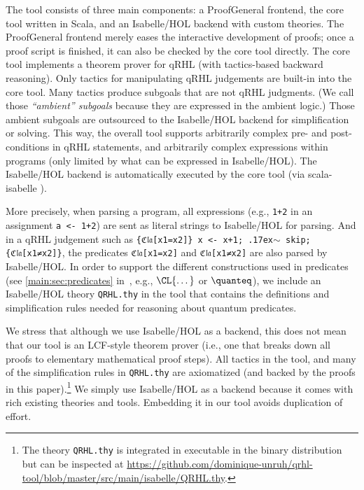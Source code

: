 \documentclass{article}
\newcommand\mytilde{\raise.17ex\hbox{$\scriptstyle\sim$}}
\newcommand\qrhlautoref[1]{\autoref*{main:#1} in~\cite{qrhl-paper-from-manual}}
\begin{document}
The tool consists of three main components: a ProofGeneral
\cite{proofgeneral} frontend, the core tool written in Scala, and an
Isabelle/HOL \cite{isabelle} backend with custom theories. The
ProofGeneral frontend merely eases the interactive development of
proofs; once a proof script is finished, it can also be checked by the
core tool directly. The core tool implements a theorem prover for qRHL
(with tactics-based backward reasoning). Only tactics for manipulating
qRHL judgements are built-in into the core tool. Many tactics produce
subgoals that are not qRHL judgments.
(We call those \emph{``ambient'' subgoals}%
 because they are expressed in the ambient logic.)
Those ambient subgoals are outsourced to
the Isabelle/HOL backend for simplification or solving. This way, the
overall tool supports arbitrarily complex pre- and post-conditions in
qRHL statements, and arbitrarily complex expressions within programs
(only limited by what can be expressed in Isabelle/HOL). The
Isabelle/HOL backend is automatically executed by the core tool (via scala-isabelle \cite{scala-isabelle}).
  

More precisely, when parsing a program, all expressions (e.g.,
\texttt{1+2} in an assignment \texttt{a <- 1+2}) are sent as literal
strings to Isabelle/HOL for parsing. And in a qRHL judgement such as
\texttt{\{ℭ𝔩𝔞[x1=x2]\} x <- x+1; \mytilde{} skip; \{ℭ𝔩𝔞[x1≠x2]\}}, the
predicates \texttt{ℭ𝔩𝔞[x1=x2]} and \texttt{ℭ𝔩𝔞[x1≠x2]} are also parsed
by Isabelle/HOL. In order to support the different constructions used
in predicates (see \qrhlautoref{sec:predicates}, e.g., $\CL{\dots}$
or $\quanteq$),
we include an Isabelle/HOL theory \texttt{QRHL.thy} in the tool that
contains the definitions and simplification rules needed for reasoning
about quantum predicates.

We stress that although we use Isabelle/HOL as a backend, this does
not mean that our tool is an LCF-style theorem prover (i.e., one that
breaks down all proofs to elementary mathematical proof steps).  All
tactics in the tool, and many of the simplification rules in
\texttt{QRHL.thy} are axiomatized (and backed by the proofs in this
paper).\footnote{The theory \texttt{QRHL.thy} is integrated in executable in the binary distribution
  but can be inspected 
  at \url{https://github.com/dominique-unruh/qrhl-tool/blob/master/src/main/isabelle/QRHL.thy}.}
We simply use Isabelle/HOL as a backend because it comes with
rich existing theories and tools. Embedding it in our tool avoids
duplication of effort.
\end{document}
